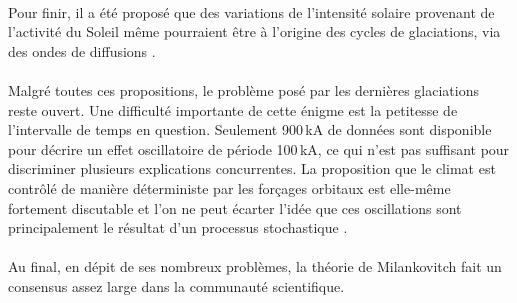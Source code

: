 \paragraph{} Pour finir, il a été proposé que des variations de l'intensité solaire provenant de l'activité du Soleil même pourraient être à l'origine des cycles de glaciations, via des ondes de diffusions \cite{ehrlich2007}. 

\paragraph{} Malgré toutes ces propositions, le problème posé par les dernières glaciations reste ouvert. Une difficulté importante de cette énigme est la petitesse de l'intervalle de temps en question. Seulement 900\,kA de données sont disponible pour décrire un effet oscillatoire de période 100\,kA, ce qui n'est pas suffisant pour discriminer plusieurs explications concurrentes. La proposition que le climat est contrôlé de manière déterministe par les forçages orbitaux est elle-même fortement discutable et l'on ne peut écarter l'idée que ces oscillations sont principalement le résultat d'un processus stochastique \cite{wunsch2004}.
 
\paragraph{} Au final, en dépit de ses nombreux problèmes, la théorie de Milankovitch fait un consensus assez large dans la communauté scientifique. %